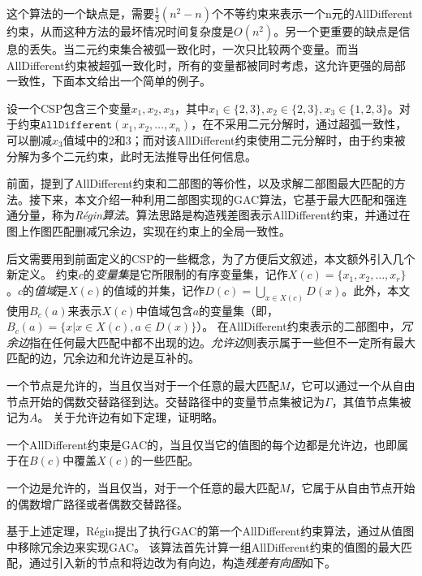 这个算法的一个缺点是，需要$\frac{1}{2}(n^2 - n)$个不等约束来表示一个n元的AllDifferent约束，从而这种方法的最坏情况时间复杂度是$O(n^2)$。另一个更重要的缺点是信息的丢失。当二元约束集合被弧一致化时，一次只比较两个变量。而当AllDifferent约束被超弧一致化时，所有的变量都被同时考虑，这允许更强的局部一致性，下面本文给出一个简单的例子。

\begin{example}
设一个CSP包含三个变量$x_1, x_2, x_3$，其中$x_1 \in \{2, 3\}, x_2 \in \{2, 3\}, x_3 \in \{1, 2, 3\}$。对于约束$\texttt {AllDifferent}(x_1, x_2, \dots, x_n)$，在不采用二元分解时，通过超弧一致性，可以删减$x_3$值域中的2和3；而对该AllDifferent约束使用二元分解时，由于约束被分解为多个二元约束，此时无法推导出任何信息。
\end{example}

前面，提到了AllDifferent约束和二部图的等价性，以及求解二部图最大匹配的方法。接下来，本文介绍一种利用二部图实现的GAC算法，它基于最大匹配和强连通分量，称为\textit{Régin算法}\cite{regin1994filtering}。算法思路是构造残差图表示AllDifferent约束，并通过在图上作图匹配删减冗余边，实现在约束上的全局一致性。

后文需要用到前面定义的CSP的一些概念，为了方便后文叙述，本文额外引入几个新定义。
约束$c$的\textit{变量集}是它所限制的有序变量集，记作$X(c) = \{x_1, x_2, \dots, x_r\}$。$c$的\textit{值域}是$X(c)$的值域的并集，记作$D(c) = \bigcup_{x \in X(c)} D(x)$。此外，本文使用$B_c(a)$来表示$X(c)$中值域包含$a$的变量集（即，$B_c(a) = \{x | x \in X(c), a \in D(x)\}$）。
在AllDifferent约束表示的二部图中，\textit{冗余边}指在任何最大匹配中都不出现的边。\textit{允许边}则表示属于一些但不一定所有最大匹配的边，冗余边和允许边是互补的。

一个节点是允许的，当且仅当对于一个任意的最大匹配$M$，它可以通过一个从自由节点开始的偶数交替路径到达。交替路径中的变量节点集被记为$\Gamma$，其值节点集被记为$A$。
关于允许边有如下定理，证明略。

\begin{theorem}
    一个AllDifferent约束是GAC的，当且仅当它的值图的每个边都是允许边，也即属于在$B(c)$中覆盖$X(c)$的一些匹配。
\end{theorem}

\begin{theorem}
    一个边是允许的，当且仅当，对于一个任意的最大匹配$M$，它属于从自由节点开始的偶数增广路径或者偶数交替路径。
\end{theorem}

基于上述定理，Régin提出了执行GAC的第一个AllDifferent约束算法，通过从值图中移除冗余边来实现GAC。
该算法首先计算一组AllDifferent约束的值图的最大匹配，通过引入新的节点和将边改为有向边，构造\textit{残差有向图}如下。

